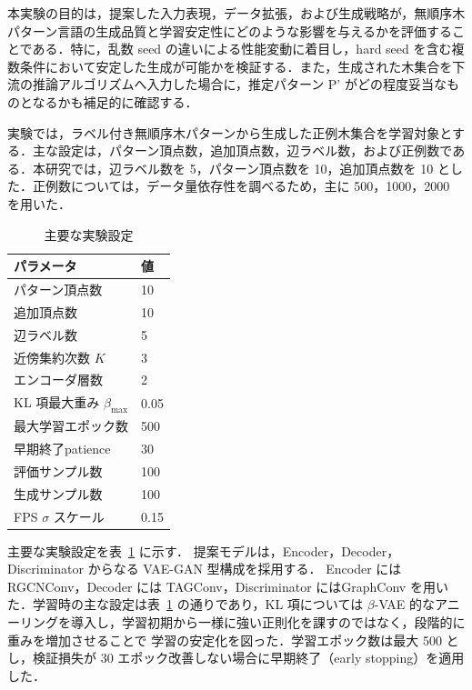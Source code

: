 \documentclass[submit,techrep,noauthor]{ipsj}
\begin{document}
本実験の目的は，提案した入力表現，データ拡張，および生成戦略が，無順序木パターン言語の生成品質と学習安定性にどのような影響を与えるかを評価することである．特に，乱数 seed の違いによる性能変動に着目し，hard seed を含む複数条件において安定した生成が可能かを検証する．また，生成された木集合を下流の推論アルゴリズムへ入力した場合に，推定パターン P' がどの程度妥当なものとなるかも補足的に確認する．


実験では，ラベル付き無順序木パターンから生成した正例木集合を学習対象とする．主な設定は，パターン頂点数，追加頂点数，辺ラベル数，および正例数である．本研究では，辺ラベル数を 5，パターン頂点数を 10，追加頂点数を 10 とした．正例数については，データ量依存性を調べるため，主に 500，1000，2000 を用いた．


\begin{table}[t]
\centering
\small
\caption{主要な実験設定}
\label{tab:config}
\begin{tabular}{ll}
\toprule
パラメータ & 値 \\
\midrule
パターン頂点数 & 10 \\
追加頂点数 & 10 \\
辺ラベル数 & 5 \\
近傍集約次数 $K$ & 3 \\
エンコーダ層数 & 2 \\
KL 項最大重み $\beta_{\max}$ & 0.05 \\
最大学習エポック数 & 500 \\
早期終了patience & 30 \\
評価サンプル数 & 100 \\
生成サンプル数 & 100 \\
FPS $\sigma$ スケール & 0.15 \\
\bottomrule
\end{tabular}
\end{table}

主要な実験設定を表~\ref{tab:config} に示す．
提案モデルは，Encoder，Decoder，Discriminator からなる VAE-GAN 型構成を採用する．
Encoder には RGCNConv，Decoder には TAGConv，Discriminator にはGraphConv を用いた．学習時の主な設定は表~\ref{tab:config} の通りであり，KL 項については $\beta$-VAE 的なアニーリングを導入し，学習初期から一様に強い正則化を課すのではなく，段階的に重みを増加させることで
学習の安定化を図った．学習エポック数は最大 500 とし，検証損失が 30 エポック改善しない場合に早期終了（early stopping）を適用した．
\end{document}
